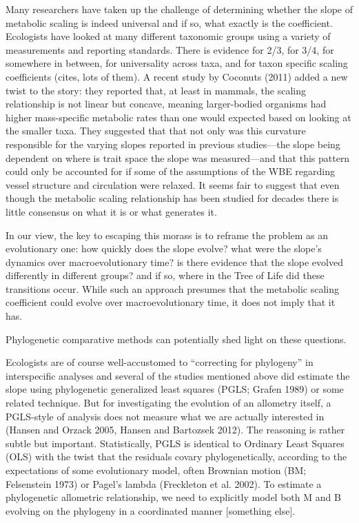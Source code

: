 \documentclass[a4paper,11pt]{article}
\begin{document}
Many researchers have taken up the challenge of determining whether the slope of metabolic scaling is indeed universal and if so, what exactly is the coefficient. Ecologists have looked at many different taxonomic groups using a variety of measurements and reporting standards. There is evidence for 2/3, for 3/4, for somewhere in between, for universality across taxa, and for taxon specific scaling coefficients (cites, lots of them). A recent study by Coconuts (2011) added a new twist to the story: they reported that, at least in mammals, the scaling relationship is not linear but concave, meaning larger-bodied organisms had higher mass-specific metabolic rates than one would expected based on looking at the smaller taxa. They suggested that that not only was this curvature responsible for the varying slopes reported in previous studies—the slope being dependent on where is trait space the slope was measured—and that this pattern could only be accounted for if some of the assumptions of the WBE regarding vessel structure and circulation were relaxed. It seems fair to suggest that even though the metabolic scaling relationship has been studied for decades there is little consensus on what it is or what generates it.

In our view, the key to escaping this morass is to reframe the problem as an evolutionary one: how quickly does the slope evolve? what were the slope’s dynamics over macroevolutionary time? is there evidence that the slope evolved differently in different groups? and if so, where in the Tree of Life did these transitions occur. While such an approach presumes that the metabolic scaling coefficient could evolve over macroevolutionary time, it does not imply that it has.

Phylogenetic comparative methods can potentially shed light on these questions.

Ecologists are of course well-accustomed to “correcting for phylogeny”  in interspecific analyses and several of the studies mentioned above did estimate the slope using phylogenetic generalized least squares (PGLS; Grafen 1989) or some related technique. But for investigating the evolution of an allometry itself, a PGLS-style of analysis does not measure what we are actually interested in (Hansen and Orzack 2005, Hansen and Bartozsek 2012). The reasoning is rather subtle but important. Statistically, PGLS is identical to Ordinary Least Squares (OLS) with the twist that the residuals covary phylogenetically, according to the expectations of some evolutionary model, often Brownian motion (BM; Felsenstein 1973) or Pagel’s lambda (Freckleton et al. 2002). To estimate a phylogenetic allometric relationship, we need to explicitly model both M and B evolving on the phylogeny in a coordinated manner [something else].
\end{document}
